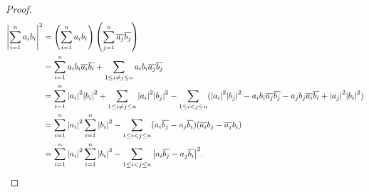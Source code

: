 \begin{proof}
	\begingroup
	\allowdisplaybreaks%
	\begin{align*}
		{\left\vert \sum^{n}_{i=1} a_{i}b_{i} \right\vert}^{2} & = \left( \sum^{n}_{i=1} a_{i}b_{i} \right)\left( \sum^{n}_{j=1} \overline{a_{j}}\overline{b_{j}} \right)                                                                                                                                                                                                                                                                                                                                                \\
		                                                       & = \sum^{n}_{i=1} a_{i}b_{i}\overline{a_{i}}\overline{b_{i}} + \sum_{1\le i \ne j \le n}a_{i}b_{i}\overline{a_{j}}\overline{b_{j}}                                                                                                                                                                                                                                                                                                                       \\
		                                                       & = \sum^{n}_{i=1} {\left\vert a_{i} \right\vert}^{2}{\left\vert b_{i} \right\vert}^{2} + \sum_{1\le i \ne j \le n} {\left\vert a_{i} \right\vert}^{2}{\left\vert b_{j} \right\vert}^{2} - \sum_{1\le i < j \le n}({\left\vert a_{i} \right\vert}^{2}{\left\vert b_{j} \right\vert}^{2} - a_{i}b_{i}\overline{a_{j}}\overline{b_{j}} - a_{j}b_{j}\overline{a_{i}}\overline{b_{i}} + {\left\vert a_{j} \right\vert}^{2}{\left\vert b_{i} \right\vert}^{2}) \\
		                                                       & = \sum^{n}_{i=1} {\left\vert a_{i} \right\vert}^{2} \sum^{n}_{i=1} {\left\vert b_{i} \right\vert}^{2} -  \sum_{1\le i < j \le n} (a_{i}\overline{b_{j}} - a_{j}\overline{b_{i}})(\overline{a_{i}}b_{j} - \overline{a_{j}}b_{i})                                                                                                                                                                                                                         \\
		                                                       & = \sum^{n}_{i=1} {\left\vert a_{i} \right\vert}^{2} \sum^{n}_{i=1} {\left\vert b_{i} \right\vert}^{2} - \sum_{1\le i < j \le n} {\left\vert a_{i}\overline{b_{j}} - a_{j}\overline{b_{i}} \right\vert}^{2}. \qedhere
	\end{align*}
	\endgroup
\end{proof}

